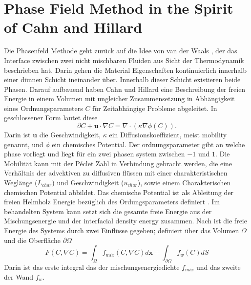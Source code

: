 \section{Phase Field Method in the Spirit of Cahn and Hillard}
Die Phasenfeld Methode geht zurück auf die Idee von van der Waals \cite{vanderwaals1979ThermodynamicTheoryCapillarity}, der das Interface zwischen zwei nicht mischbaren Fluiden aus Sicht der Thermodynamik beschrieben hat. Darin gehen die Material Eigenschaften kontinuierlich innerhalb einer dünnen Schicht ineinander über. Innerhalb dieser Schicht existieren beide Phasen. 
Darauf aufbauend haben Cahn und Hillard \cite{johnw.FreeEnergyNonuniform1958} eine Beschreibung der freien Energie in einem Volumen mit ungleicher Zusammensetzung in Abhängigkeit eines Ordnungsparameters $C$ für Zeitabhängige Probleme abgeleitet. In geschlossener Form lautet diese
\begin{equation}
\label{eq: CahnHillard}
    \partial C + \textbf{u} \cdot \nabla C = \nabla \cdot \left(\kappa \nabla \phi(C)\right).
\end{equation}
Darin ist $\textbf{u}$ die Geschwindigkeit, $\kappa$ ein Diffusionskoeffizient, meist mobility genannt, und $\phi$ ein chemisches Potential. Der ordnungsparameter gibt an welche phase vorliegt und liegt für ein zwei phasen system zwischen $-1$ und $1$. Die Mobilität kann mit der Péclet Zahl in Verbindung gebracht werden, die eine Verhältnis der advektiven zu diffusiven flüssen mit einer charakteristischen Weglänge ($L_{char}$) und Geschwindigkeit ($u_{char}$), sowie einem Charakterischen chemischen Potential abbildet\cite{cai2015NumericalSimulationWetting,holzinger2021DirectNumericalSimulation}. 
Das chemische Potential ist als Ableitung der freien Helmholz Energie bezüglich des Ordungsparameters definiert \cite{johnw.FreeEnergyNonuniform1958}. Im behandelten System kann setzt sich die gesamte freie Energie aus der Mischungsenergie und der interfacial density energy zusammen. Nach \cite{yue2010SharpinterfaceLimitCahn} ist die freie Energie des Systems durch zwei Einflüsse gegeben; definiert über das Volumen $\Omega$ und die Oberfläche $\partial\Omega$ 
\begin{equation}
    F(C, \nabla C) = \int_{\Omega} f_{mix} (C, \nabla C) d\textbf{x}+ \int_{\partial\Omega}f_w(C) dS
\end{equation}
Darin ist das erste integral das der mischungsenergiedichte $f_{mix}$ und das zweite der Wand $f_w$.

